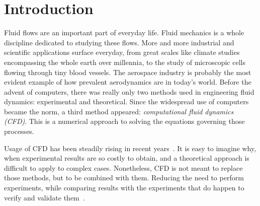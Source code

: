 \chapter{Introduction}
Fluid flows are an important part of everyday life. Fluid mechanics is a whole discipline dedicated
to studying these flows. More and more industrial and scientific applications surface everyday, from
great scales like climate studies encompassing the whole earth over millennia, to the study of
microscopic cells flowing through tiny blood vessels. The aerospace industry is probably the most
evident example of how prevalent aerodynamics are in today's world. Before the advent of computers,
there was really only two methods used in engineering fluid dynamics: experimental and theoretical.
Since the widespread use of computers became the norm, a third method appeared:
\textit{computational fluid dynamics (CFD)}. This is a numerical approach to solving the equations
governing those processes.

Usage of CFD has been steadily rising in recent years~\cite{Slotnick2014}. It is easy to imagine
why, when experimental results are so costly to obtain, and a theoretical approach is difficult to
apply to complex cases. Nonetheless, CFD is not meant to replace those methods, but to be combined
with them. Reducing the need to perform experiments, while comparing results with the experiments
that do happen to verify and validate them~\cite{Stern2001}.